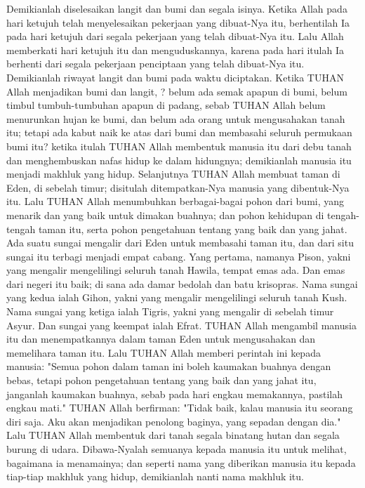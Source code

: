 \begin{biblechapter} %
\verse Demikianlah diselesaikan langit dan bumi dan segala isinya.
\verse Ketika Allah pada hari ketujuh telah menyelesaikan pekerjaan yang dibuat-Nya itu, berhentilah Ia pada hari ketujuh dari segala pekerjaan yang telah dibuat-Nya itu.
\verse Lalu Allah memberkati hari ketujuh itu dan menguduskannya, karena pada hari itulah Ia berhenti dari segala pekerjaan penciptaan yang telah dibuat-Nya itu.
\verse Demikianlah riwayat langit dan bumi pada waktu diciptakan. Ketika TUHAN Allah menjadikan bumi dan langit, ?
\verse belum ada semak apapun di bumi, belum timbul tumbuh-tumbuhan apapun di padang, sebab TUHAN Allah belum menurunkan hujan ke bumi, dan belum ada orang untuk mengusahakan tanah itu;
\verse tetapi ada kabut naik ke atas dari bumi dan membasahi seluruh permukaan bumi itu?
\verse ketika itulah TUHAN Allah membentuk manusia itu dari debu tanah dan menghembuskan nafas hidup ke dalam hidungnya; demikianlah manusia itu menjadi makhluk yang hidup.
 Selanjutnya TUHAN Allah membuat taman di Eden, di sebelah timur; disitulah ditempatkan-Nya manusia yang dibentuk-Nya itu.
\verse Lalu TUHAN Allah menumbuhkan berbagai-bagai pohon dari bumi, yang menarik dan yang baik untuk dimakan buahnya; dan pohon kehidupan di tengah-tengah taman itu, serta pohon pengetahuan tentang yang baik dan yang jahat.
\verse Ada suatu sungai mengalir dari Eden untuk membasahi taman itu, dan dari situ sungai itu terbagi menjadi empat cabang.
\verse Yang pertama, namanya Pison, yakni yang mengalir mengelilingi seluruh tanah Hawila, tempat emas ada.
\verse Dan emas dari negeri itu baik; di sana ada damar bedolah dan batu krisopras.
\verse Nama sungai yang kedua ialah Gihon, yakni yang mengalir mengelilingi seluruh tanah Kush.
\verse Nama sungai yang ketiga ialah Tigris, yakni yang mengalir di sebelah timur Asyur. Dan sungai yang keempat ialah Efrat.
\verse TUHAN Allah mengambil manusia itu dan menempatkannya dalam taman Eden untuk mengusahakan dan memelihara taman itu.
\verse Lalu TUHAN Allah memberi perintah ini kepada manusia: "Semua pohon dalam taman ini boleh kaumakan buahnya dengan bebas,
\verse tetapi pohon pengetahuan tentang yang baik dan yang jahat itu, janganlah kaumakan buahnya, sebab pada hari engkau memakannya, pastilah engkau mati."
\verse TUHAN Allah berfirman: "Tidak baik, kalau manusia itu seorang diri saja. Aku akan menjadikan penolong baginya, yang sepadan dengan dia."
\verse Lalu TUHAN Allah membentuk dari tanah segala binatang hutan dan segala burung di udara. Dibawa-Nyalah semuanya kepada manusia itu untuk melihat, bagaimana ia menamainya; dan seperti nama yang diberikan manusia itu kepada tiap-tiap makhluk yang hidup, demikianlah nanti nama makhluk itu.

\end{biblechapter}
